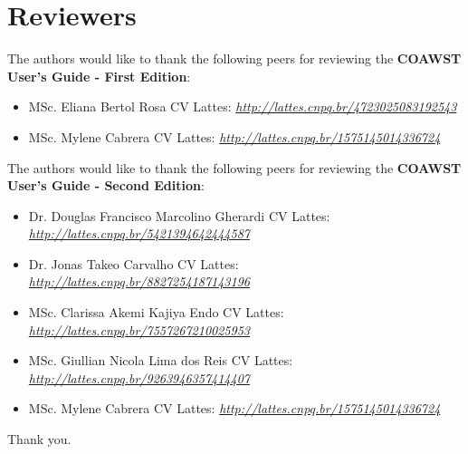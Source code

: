\chapter*{Reviewers}

\bigskip
\noindent The authors would like to thank the following peers for reviewing the \textbf{COAWST User's Guide  - First Edition}:
\bigskip

\begin{itemize}
    \item MSc. Eliana Bertol Rosa \newline CV Lattes: \textit{\textcolor{bleu_cite}{\href{http://lattes.cnpq.br/4723025083192543}{http://lattes.cnpq.br/4723025083192543}}}
    \bigskip
    \item MSc. Mylene Cabrera \newline CV Lattes: \textit{\textcolor{bleu_cite}{\href{http://lattes.cnpq.br/1575145014336724}{http://lattes.cnpq.br/1575145014336724}}}
\end{itemize}

\bigskip
\bigskip
\noindent The authors would like to thank the following peers for reviewing the \textbf{COAWST User's Guide - Second Edition}:
\bigskip

\begin{itemize}
    \item Dr. Douglas Francisco Marcolino Gherardi \newline CV Lattes: \textit{\textcolor{bleu_cite}{\href{http://lattes.cnpq.br/5421394642444587}{http://lattes.cnpq.br/5421394642444587}}}
    \bigskip
    \item Dr. Jonas Takeo Carvalho \newline CV Lattes: \textit{\textcolor{bleu_cite}{\href{http://lattes.cnpq.br/8827254187143196}{http://lattes.cnpq.br/8827254187143196}}}
    \bigskip
    \item MSc. Clarissa Akemi Kajiya Endo \newline CV Lattes: \textit{\textcolor{bleu_cite}{\href{http://lattes.cnpq.br/7557267210025953}{http://lattes.cnpq.br/7557267210025953}}}
    \bigskip
    \item MSc. Giullian Nicola Lima dos Reis \newline CV Lattes: \textit{\textcolor{bleu_cite}{\href{http://lattes.cnpq.br/9263946357414407}{http://lattes.cnpq.br/9263946357414407}}}
    \bigskip
    \item MSc. Mylene Cabrera \newline CV Lattes: \textit{\textcolor{bleu_cite}{\href{http://lattes.cnpq.br/1575145014336724}{http://lattes.cnpq.br/1575145014336724}}}
\end{itemize}
\bigskip
    Thank you. \\
